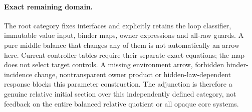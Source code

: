 \documentclass[11pt]{article}
\begin{document}
\paragraph{Exact remaining domain.}
The root category fixes interfaces and explicitly retains the loop classifier, immutable value input, binder maps, owner expressions and all-raw guards. A pure middle balance that changes any of them is not automatically an arrow here. Current controller tables require their separate exact equations; the map does not select target controls. A missing environment arrow, forbidden binder-incidence change, nontransparent owner product or hidden-law-dependent response blocks this parameter construction. The adjunction is therefore a genuine relative initial section over this independently defined category, not feedback on the entire balanced relative quotient or all opaque core systems.
\end{document}
